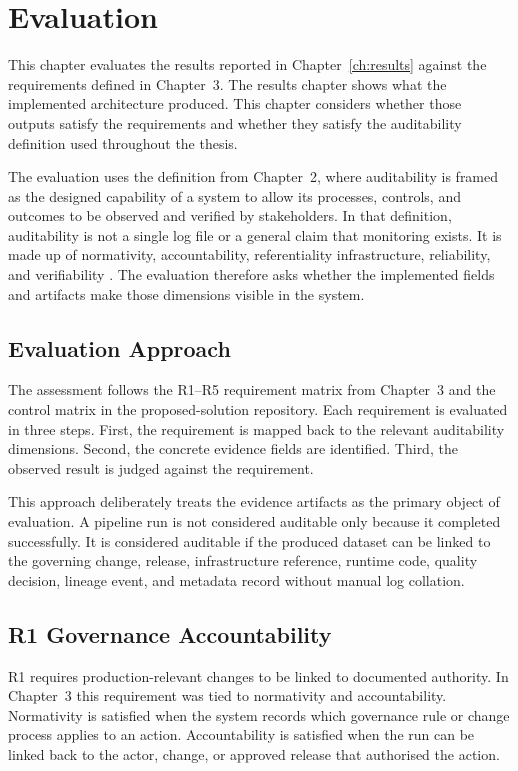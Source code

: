 \chapter{Evaluation}
\label{ch:evaluation}
\noindent
This chapter evaluates the results reported in Chapter~\ref{ch:results}
against the requirements defined in Chapter~3. The results chapter shows what
the implemented architecture produced. This chapter considers whether those
outputs satisfy the requirements and whether they satisfy the auditability
definition used throughout the thesis.

The evaluation uses the definition from Chapter~2, where auditability is framed
as the designed capability of a system to allow its processes, controls, and
outcomes to be observed and verified by stakeholders. In that definition,
auditability is not a single log file or a general claim that monitoring
exists. It is made up of normativity, accountability, referentiality
infrastructure, reliability, and verifiability
\cite{weigand_auditability_2019}. The evaluation therefore asks whether the
implemented fields and artifacts make those dimensions visible in the system.

\section{Evaluation Approach}
\noindent
The assessment follows the R1--R5 requirement matrix from Chapter~3 and the
control matrix in the proposed-solution repository. Each requirement is
evaluated in three steps. First, the requirement is mapped back to the relevant
auditability dimensions. Second, the concrete evidence fields are identified.
Third, the observed result is judged against the requirement.

This approach deliberately treats the evidence artifacts as the primary object
of evaluation. A pipeline run is not considered auditable only because it
completed successfully. It is considered auditable if the produced dataset can
be linked to the governing change, release, infrastructure reference, runtime
code, quality decision, lineage event, and metadata record without manual log
collation.

\section{R1 Governance Accountability}
\noindent
R1 requires production-relevant changes to be linked to documented authority.
In Chapter~3 this requirement was tied to normativity and accountability.
Normativity is satisfied when the system records which governance rule or
change process applies to an action. Accountability is satisfied when the run
can be linked back to the actor, change, or approved release that authorised
the action.


